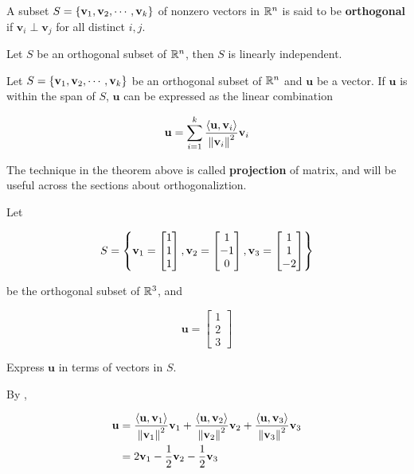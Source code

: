 \documentclass[a4paper,12pt]{article}
\begin{document}
\begin{dft}
  A subset $S=\left\{ \mathbf{v}_{1},\mathbf{v}_{2},\cdots,\mathbf{v}_{k}\right\}$ of nonzero vectors in $\mathbb{R}^{n}$ is said to be \textbf{orthogonal} if $\mathbf{v}_{i}\perp\mathbf{v}_{j}$ for all distinct $i,j$.
\end{dft}\n

\begin{thm}
  Let $S$ be an orthogonal subset of $\mathbb{R}^{n}$, then $S$ is linearly independent.
\end{thm}\n

\begin{thm}
  Let $S=\left\{ \mathbf{v}_{1},\mathbf{v}_{2},\cdots,\mathbf{v}_{k}\right\}$ be an orthogonal subset of $\mathbb{R}^{n}$ and $\mathbf{u}$ be a vector. If $\mathbf{u}$ is within the span of $S$, $\mathbf{u}$ can be expressed as the linear combination

  $$\mathbf{u}=\sum_{i=1}^{k}\frac{\left\langle \mathbf{u},\mathbf{v}_{i}\right\rangle}{\left\| \mathbf{v}_{i}\right\|^{2}}\mathbf{v}_{i}$$
\end{thm}\n

The technique in the theorem above is called \textbf{projection} of matrix, and will be useful across the sections about orthogonaliztion.\n

\begin{exm}
  Let

  $$S=\left\{ \mathbf{v}_{1}=\begin{bmatrix}
    1\\
    1\\
    1
  \end{bmatrix},\mathbf{v}_{2}=\begin{bmatrix}
    1\\
    -1\\
    0
  \end{bmatrix},\mathbf{v}_{3}=\begin{bmatrix}
    1\\
    1\\
    -2
  \end{bmatrix}\right\}$$\s

  be the orthogonal subset of $\mathbb{R}^{3}$, and

  $$\mathbf{u}=\begin{bmatrix}
    1\\
    2\\
    3
  \end{bmatrix}$$\s

  Express $\mathbf{u}$ in terms of vectors in $S$.\n

  \ans By \rthm[\sctd{1}],

  $$\begin{aligned}[t]
    \mathbf{u}&=\frac{\left\langle \mathbf{u},\mathbf{v}_{1}\right\rangle}{\left\| \mathbf{v}_{1}\right\|^{2}}\mathbf{v}_{1}+\frac{\left\langle \mathbf{u},\mathbf{v}_{2}\right\rangle}{\left\| \mathbf{v}_{2}\right\|^{2}}\mathbf{v}_{2}+\frac{\left\langle \mathbf{u},\mathbf{v}_{3}\right\rangle}{\left\| \mathbf{v}_{3}\right\|^{2}}\mathbf{v}_{3}\\
    &=2\mathbf{v}_{1}-\frac{1}{2}\mathbf{v}_{2}-\frac{1}{2}\mathbf{v}_{3}
  \end{aligned}$$
\end{exm}
\end{document}
